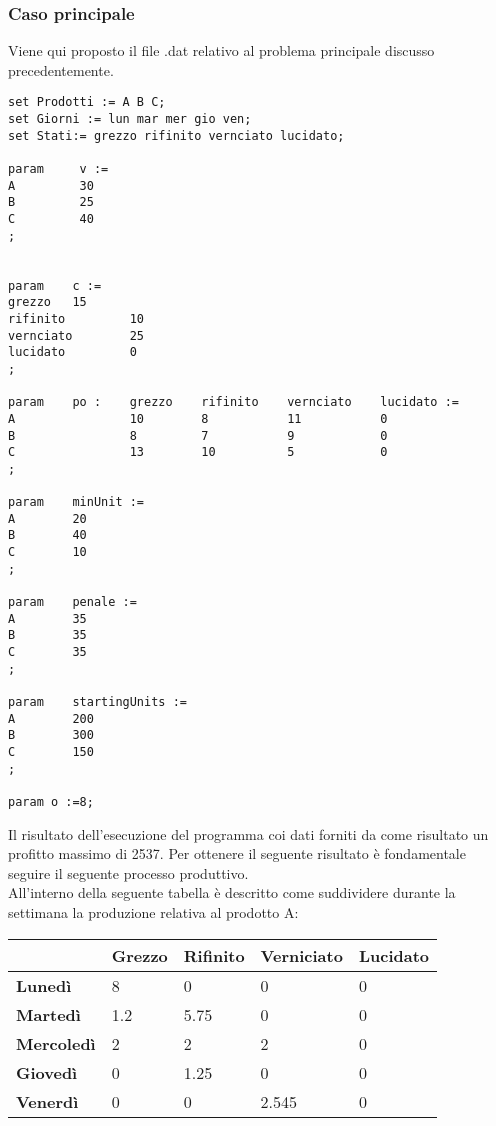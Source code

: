 \documentclass[12pt]{article}
\begin{document}
\subsubsection{Caso principale}
Viene qui proposto il file .dat relativo al problema principale discusso precedentemente.
\begin{lstlisting}
set Prodotti := A B C;
set Giorni := lun mar mer gio ven;
set Stati:= grezzo rifinito vernciato lucidato;

param     v :=
A		  30
B		  25
C		  40
;


param    c :=
grezzo   15
rifinito		 10
vernciato		 25
lucidato		 0
;

param 	 po :    grezzo    rifinito    vernciato    lucidato :=
A                10        8    	   11   		0         
B                8         7    	   9    		0
C                13        10   	   5   		    0
;

param    minUnit :=
A		 20
B		 40
C		 10
;

param 	 penale :=
A		 35
B		 35
C		 35
;

param 	 startingUnits :=
A		 200
B	  	 300
C		 150
;

param o :=8;
\end{lstlisting}
Il risultato dell'esecuzione del programma coi dati forniti da come risultato un profitto massimo di 2537.
Per ottenere il seguente risultato è fondamentale seguire il seguente processo produttivo.\\
All'interno della seguente tabella è descritto come suddividere durante la settimana la produzione relativa al prodotto A:
\begin{table}[H]
	\centering
	\setlength{\tabcolsep}{15pt} %
	\renewcommand{\arraystretch}{2} %
	\begin{center}
	\begin{tabular}{|l|l|l|l|l|}
		\hline
		& \textbf{Grezzo} & \textbf{Rifinito} & \textbf{Verniciato} & \textbf{Lucidato} \\ \hline
		\textbf{Lunedì}    & 8               & 0                 & 0                   & 0                 \\ \hline
		\textbf{Martedì}   & 1.2               & 5.75              & 0                   & 0                 \\ \hline
		\textbf{Mercoledì} & 2             & 2                 & 2             & 0                 \\ \hline
		\textbf{Giovedì}   & 0               & 1.25              & 0                   & 0                 \\ \hline
		\textbf{Venerdì}   & 0               & 0                 & 2.545               & 0                 \\ \hline
	\end{tabular}
	\end{center}
\end{table}
\end{document}
